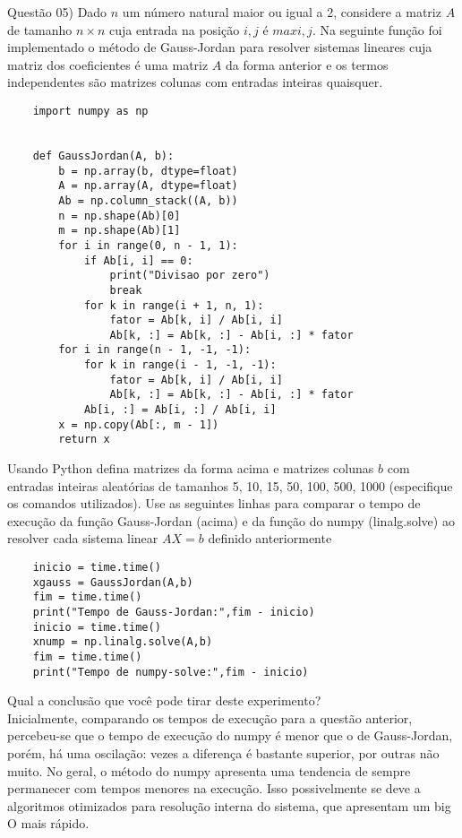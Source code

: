 
\noindent \textcolor{COLOR1}{Questão 05)} Dado $n$ um número natural maior ou igual a 2, considere a matriz $A$ de tamanho
$n \times n$ cuja entrada na posição $i, j$ é $max{i, j}$. Na seguinte função foi implementado o método
de Gauss-Jordan para resolver sistemas lineares cuja matriz dos coeficientes é uma matriz $A$ da
forma anterior e os termos independentes são matrizes colunas com entradas inteiras quaisquer.
\\

\begin{lstlisting}
    import numpy as np


    def GaussJordan(A, b):
        b = np.array(b, dtype=float)
        A = np.array(A, dtype=float)
        Ab = np.column_stack((A, b))
        n = np.shape(Ab)[0]
        m = np.shape(Ab)[1]
        for i in range(0, n - 1, 1):
            if Ab[i, i] == 0:
                print("Divisao por zero")
                break
            for k in range(i + 1, n, 1):
                fator = Ab[k, i] / Ab[i, i]
                Ab[k, :] = Ab[k, :] - Ab[i, :] * fator
        for i in range(n - 1, -1, -1):
            for k in range(i - 1, -1, -1):
                fator = Ab[k, i] / Ab[i, i]
                Ab[k, :] = Ab[k, :] - Ab[i, :] * fator
            Ab[i, :] = Ab[i, :] / Ab[i, i]
        x = np.copy(Ab[:, m - 1])
        return x
\end{lstlisting}


Usando Python defina matrizes da forma acima e matrizes colunas $b$ com entradas inteiras aleatórias de tamanhos 5, 10, 15, 50, 100, 500, 1000 (especifique os comandos utilizados). Use as seguintes linhas para comparar o tempo de execução da função Gauss-Jordan (acima) e da função do numpy (linalg.solve) ao resolver cada sistema linear $AX = b$ definido anteriormente
\\

\begin{lstlisting}
    inicio = time.time()
    xgauss = GaussJordan(A,b)
    fim = time.time()
    print("Tempo de Gauss-Jordan:",fim - inicio)
    inicio = time.time()
    xnump = np.linalg.solve(A,b)
    fim = time.time()
    print("Tempo de numpy-solve:",fim - inicio)    
\end{lstlisting}

Qual a conclusão que você pode tirar deste experimento?
\\

Inicialmente, comparando os tempos de execução para a questão anterior, percebeu-se que o tempo de execução do numpy é menor que o de Gauss-Jordan, porém, há uma oscilação: vezes a diferença é bastante superior, por outras não muito. No geral, o método do numpy apresenta uma tendencia de sempre permanecer com tempos menores na execução. Isso possivelmente se deve a algoritmos otimizados para resolução interna do sistema, que apresentam um big O mais rápido.
\\

